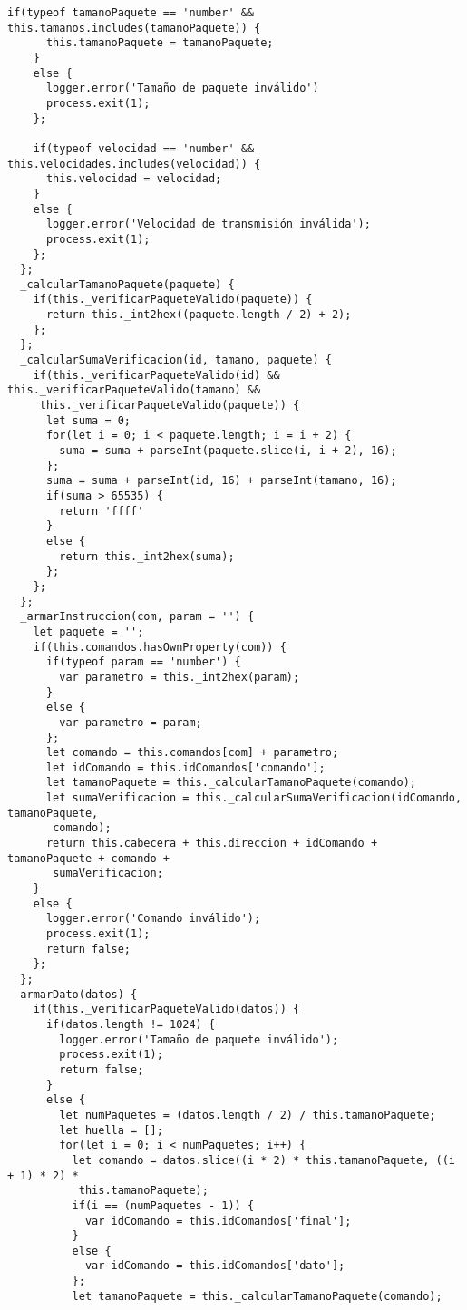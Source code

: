 \begin{lstlisting}[label=anx:libreria_zfm20]
    if(typeof tamanoPaquete == 'number' && this.tamanos.includes(tamanoPaquete)) {
      this.tamanoPaquete = tamanoPaquete;
    }
    else {
      logger.error('Tamaño de paquete inválido')
      process.exit(1);
    };

    if(typeof velocidad == 'number' && this.velocidades.includes(velocidad)) {
      this.velocidad = velocidad;
    }
    else {
      logger.error('Velocidad de transmisión inválida');
      process.exit(1);
    };
  };
  _calcularTamanoPaquete(paquete) {
    if(this._verificarPaqueteValido(paquete)) {
      return this._int2hex((paquete.length / 2) + 2);
    };
  };
  _calcularSumaVerificacion(id, tamano, paquete) {
    if(this._verificarPaqueteValido(id) && this._verificarPaqueteValido(tamano) &&
     this._verificarPaqueteValido(paquete)) {
      let suma = 0;
      for(let i = 0; i < paquete.length; i = i + 2) {
        suma = suma + parseInt(paquete.slice(i, i + 2), 16);
      };
      suma = suma + parseInt(id, 16) + parseInt(tamano, 16);
      if(suma > 65535) {
        return 'ffff'
      }
      else {
        return this._int2hex(suma);
      };
    };
  };
  _armarInstruccion(com, param = '') {
    let paquete = '';
    if(this.comandos.hasOwnProperty(com)) {
      if(typeof param == 'number') {
        var parametro = this._int2hex(param);
      }
      else {
        var parametro = param;
      };
      let comando = this.comandos[com] + parametro;
      let idComando = this.idComandos['comando'];
      let tamanoPaquete = this._calcularTamanoPaquete(comando);
      let sumaVerificacion = this._calcularSumaVerificacion(idComando, tamanoPaquete,
       comando);
      return this.cabecera + this.direccion + idComando + tamanoPaquete + comando +
       sumaVerificacion;
    }
    else {
      logger.error('Comando inválido');
      process.exit(1);
      return false;
    };
  };
  armarDato(datos) {
    if(this._verificarPaqueteValido(datos)) {
      if(datos.length != 1024) {
        logger.error('Tamaño de paquete inválido');
        process.exit(1);
        return false;
      }
      else {
        let numPaquetes = (datos.length / 2) / this.tamanoPaquete;
        let huella = [];
        for(let i = 0; i < numPaquetes; i++) {
          let comando = datos.slice((i * 2) * this.tamanoPaquete, ((i + 1) * 2) *
           this.tamanoPaquete);
          if(i == (numPaquetes - 1)) {
            var idComando = this.idComandos['final'];
          }
          else {
            var idComando = this.idComandos['dato'];
          };
          let tamanoPaquete = this._calcularTamanoPaquete(comando);

\end{lstlisting}
